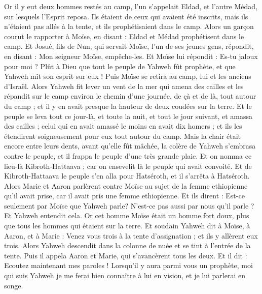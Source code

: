 \begin{multicols}{2}
Or il y eut deux hommes restés au camp, l'un s'appelait Eldad, et l'autre Médad, sur lesquels l'Esprit reposa. Ils étaient de ceux qui avaient été inscrits, mais ils n'étaient pas allés à la tente, et ils prophétisaient dans le camp.
Alors un garçon courut le rapporter à Moïse, en disant : Eldad et Médad prophétisent dans le camp.
Et Josué, fils de Nun, qui servait Moïse, l'un de ses jeunes gens, répondit, en disant : Mon seigneur Moïse, empêche-les.
Et Moïse lui répondit : Es-tu jaloux pour moi ? Plût à Dieu que tout le peuple de Yahweh fût prophète, et que Yahweh mît son esprit sur eux !
Puis Moïse se retira au camp, lui et les anciens d'Israël.
Alors Yahweh fit lever un vent de la mer qui amena des cailles et les répandit sur le camp environ le chemin d'une journée, de çà et de là, tout autour du camp ; et il y en avait presque la hauteur de deux coudées sur la terre.
Et le peuple se leva tout ce jour-là, et toute la nuit, et tout le jour suivant, et amassa des cailles ; celui qui en avait amassé le moins en avait dix homers ; et ils les étendirent soigneusement pour eux tout autour du camp.
Mais la chair était encore entre leurs dents, avant qu'elle fût mâchée, la colère de Yahweh s'embrasa contre le peuple, et il frappa le peuple d'une très grande plaie.
Et on nomma ce lieu-là Kibroth-Hattaava ; car on ensevelit là le peuple qui avait convoité.
Et de Kibroth-Hattaava le peuple s'en alla pour Hatséroth, et il s'arrêta à Hatséroth.
\VerseOne{}Alors Marie et Aaron parlèrent contre Moïse au sujet de la femme ethiopienne qu'il avait prise, car il avait pris une femme ethiopienne.
Et ils dirent : Est-ce seulement par Moïse que Yahweh parle? N'est-ce pas aussi par nous qu'il parle ? Et Yahweh entendit cela. 
Or cet homme Moïse était un homme fort doux, plus que tous les hommes qui étaient sur la terre.
Et soudain Yahweh dit à Moïse, à Aaron, et à Marie : Venez vous trois à la tente d'assignation ; et ils y allèrent eux trois.
Alors Yahweh descendit dans la colonne de nuée et se tint à l'entrée de la tente. Puis il appela Aaron et Marie, qui s'avancèrent tous les deux.
Et il dit : Ecoutez maintenant mes paroles ! Lorsqu'il y aura parmi vous un prophète, moi qui suis Yahweh je me ferai bien connaître à lui en vision, et je lui parlerai en songe.

\end{multicols}
